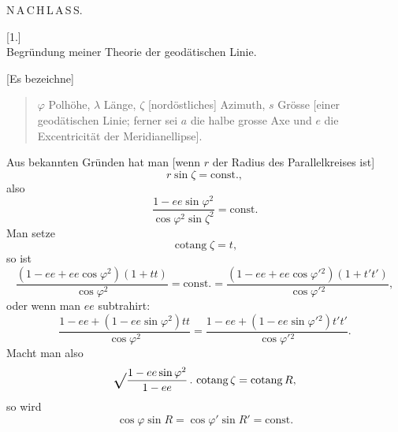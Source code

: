\begingroup
\setlength{\abovedisplayskip}{6pt}
\setlength{\belowdisplayskip}{6pt}
\setlength{\abovedisplayshortskip}{3pt}
\setlength{\belowdisplayshortskip}{4pt}
\def\ixrad{\mathord{\vcenter{\hbox{\Large\(\surd\)}}}}
\def\ixeq#1#2{%
  \par\noindent\hspace{.06\linewidth}%
  \makebox[.10\linewidth][l]{#1}%
  \makebox[.68\linewidth][c]{\(\displaystyle #2\)}\par\smallskip}
\def\ixmathdots#1{\mathinner{\ifcase#1\or.\or.\,.\or.\,.\,.\or.\,.\,.\,.\or.\,.\,.\,.\,.\fi}}
\def\ixpoints#1{\(\ixmathdots{#1}\)}

\par\clearpage

\vspace*{.10\textheight}
\begin{center}{\LARGE N\,A\,C\,H\,L\,A\,S\,S.}\end{center}
\vspace{.05\textheight}
\begin{center}
[1.]\\[.5ex]
Begründung meiner Theorie der geodätischen Linie.
\end{center}

[Es bezeichne]
\begin{quote}
\(\varphi\) Polhöhe, \(\lambda\) Länge, \(\zeta\) [nordöstliches] Azimuth, \(s\) Grösse
[einer geodätischen Linie; ferner sei \(a\) die halbe grosse Axe und \(e\) die
Excentricität der Meridianellipse].
\end{quote}

Aus bekannten Gründen hat man [wenn \(r\) der Radius des Parallelkreises ist]
\[
r\sin\zeta=\text{const.},
\]
\noindent also
\[
\frac{1-ee\sin\varphi^2}{\cos\varphi^2\sin\zeta^2}=\text{const.}
\]
Man setze
\[
\operatorname{cotang}\zeta=t,
\]
\noindent so ist
\[
\frac{(1-ee+ee\cos\varphi^2)(1+tt)}{\cos\varphi^2}
=\text{const.}=
\frac{(1-ee+ee\cos\varphi'{}^2)(1+t't')}{\cos\varphi'{}^2},
\]
\noindent oder wenn man \(ee\) subtrahirt:
\[
\frac{1-ee+(1-ee\sin\varphi^2)tt}{\cos\varphi^2}
=\frac{1-ee+(1-ee\sin\varphi'{}^2)t't'}{\cos\varphi'{}^2}.
\]
Macht man also
\[
\ixrad\frac{1-ee\sin\varphi^2}{1-ee}\,.\,\operatorname{cotang}\zeta
=\operatorname{cotang}R,
\]
\noindent so wird
\[
\cos\varphi\sin R=\cos\varphi'\sin R'=\text{const.}
\]

\par\clearpage
\noindent\makebox[12mm][l]{}\par\medskip

